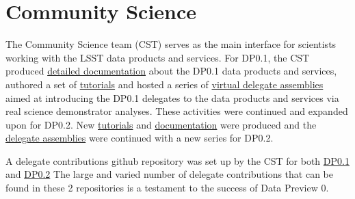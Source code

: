 \section{Community Science} \label{sec:cst}

The Community Science team (CST) serves as the main interface for scientists working with the LSST data products and services. 
For DP0.1, the CST produced \href{https://dp0-1.lsst.io/}{detailed documentation} about the DP0.1 data products and services, authored a set of \href{https://github.com/rubin-dp0/tutorial-notebooks}{tutorials} and hosted a series of \href{https://dp0-1.lsst.io/dp0-delegate-resources/index.html\#dp0-delegate-assemblies}{virtual delegate assemblies} aimed at introducing the DP0.1 delegates to the data products and services via real science demonstrator analyses.
These activities were continued and expanded upon for DP0.2. 
New \href{https://github.com/rubin-dp0/tutorial-notebooks}{tutorials} and  \href{dp0-2.lsst.io}{documentation} were produced and the \href{https://dp0-2.lsst.io/dp0-delegate-resources/index.html\#dp0-delegate-assemblies}{delegate assemblies} were continued with a new series for DP0.2.

A delegate contributions github repository was set up by the CST for both \href{https://github.com/rubin-dp0/delegate-contributions-dp01}{DP0.1} and \href{https://github.com/rubin-dp0/delegate-contributions-dp02}{DP0.2}
The large and varied number of delegate contributions that can be found in these 2 repositories is a testament to the success of Data Preview 0. 